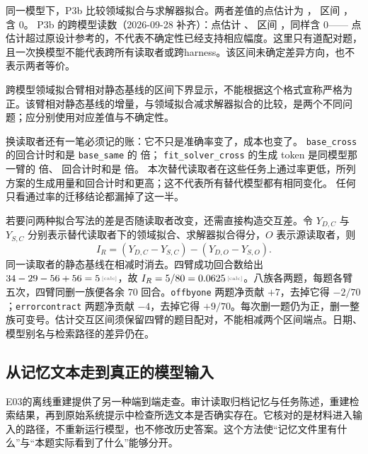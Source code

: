 \begin{sloppypar}
同一模型下，P3b 比较领域拟合与求解器拟合。两者差值的点估计为 ，
区间 \measured{$[-0.1375, +0.1500]$}，含 0。
P3b 的跨模型读数（2026-09-28 补齐）：点估计 、
区间 \measured{$[-0.0625, +0.1750]$}，同样含 0——
点估计超过原设计参考的，不代表不确定性已经支持相应幅度。这里只有道配对题，且一次换模型不能代表跨所有读取者或跨harness。该区间未确定差异方向，也不表示两者等价。

跨模型领域拟合臂相对静态基线的区间下界显示，不能根据这个格式宣称严格为正。该臂相对静态基线的增量，与领域拟合减求解器拟合的比较，是两个不同问题；应分别使用对应差值与不确定性。\end{sloppypar}

\begin{sloppypar}
换读取者还有一笔必须记的账：它不只是准确率变了，成本也变了。
\texttt{base\_cross} 的回合计时和是 \texttt{base\_same} 的  倍；
\texttt{fit\_solver\_cross} 的生成 token 是同模型那一臂的  倍、
回合计时和是  倍。
本次替代读取者在这些任务上通过率更低，所列方案的生成用量和回合计时和更高；这不代表所有替代模型都有相同变化。
任何只看通过率的迁移结论都漏掉了这一半。
\end{sloppypar}

若要问两种拟合写法的差是否随读取者改变，还需直接构造交互差。令 $Y_{D,C}$ 与 $Y_{S,C}$ 分别表示替代读取者下的领域拟合、求解器拟合得分，$O$ 表示源读取者，则
\begin{equation}
 I_R=(Y_{D,C}-Y_{S,C})-(Y_{D,O}-Y_{S,O}).
 \label{eq:ch15-reader-interaction}
\end{equation}
同一读取者的静态基线在相减时消去。四臂成功回合数给出 $\calcnum{34-29-56+56=5}$，故 $I_R=5/80=\calcnum{0.0625}$。八族各两题，每题各臂五次，四臂同删一族便各余 $70$ 回合。\texttt{offbyone} 两题净贡献 $+7$，去掉它得 $-2/70$；\texttt{errorcontract} 两题净贡献 $-4$，去掉它得 $+9/70$。每次删一题仍为正，删一整族可变号。估计交互区间须保留四臂的题目配对，不能相减两个区间端点。日期、模型别名与检索路径的差异仍在。

\subsection{从记忆文本走到真正的模型输入}
\label{sec:ch15-inputpath}

E03的离线重建提供了另一种端到端走查。审计读取归档记忆与任务陈述，重建检索结果，再到原始系统提示中检查所选文本是否确实存在。它核对的是材料进入输入的路径，不重新运行模型，也不修改历史答案。这个方法使“记忆文件里有什么”与“本题实际看到了什么”能够分开。

